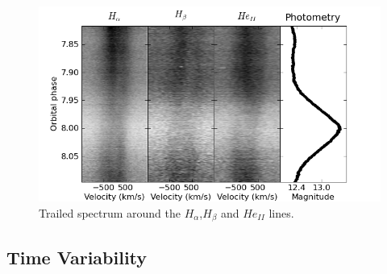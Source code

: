 \begin{figure}
 \centering
 \includegraphics[width = \columnwidth, bb=0 0 700 400]{spectroscopy/final/specgram.png}
 \caption{Trailed spectrum around the $H_{\alpha}$,$H_{\beta}$ and $He_{II}$ lines.}
 \label{specgram}
\end{figure}





% 
% 



\subsection{Time Variability}
\label{spec_timevar}

